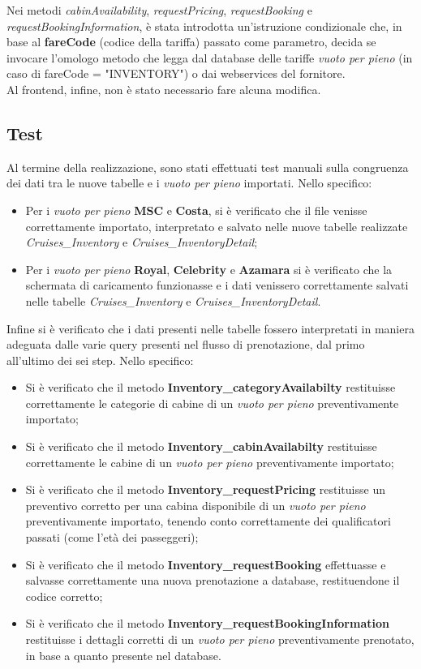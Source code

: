 Nei metodi \textit{cabinAvailability}, \textit{requestPricing}, \textit{requestBooking} e \textit{requestBookingInformation}, è stata introdotta un'istruzione condizionale che, in base al \textbf{fareCode} (codice della tariffa) passato come parametro, decida se invocare l'omologo metodo che legga dal database delle tariffe \textit{vuoto per pieno} (in caso di fareCode = "INVENTORY") o dai \glspl{webservice} del fornitore.\\
Al frontend, infine, non è stato necessario fare alcuna modifica.
\subsection{Test}
Al termine della realizzazione, sono stati effettuati test manuali sulla congruenza dei dati tra le nuove tabelle e i \textit{vuoto per pieno} importati. Nello specifico:
\begin{itemize}
	\item Per i \textit{vuoto per pieno} \textbf{MSC} e \textbf{Costa}, si è verificato che il file venisse correttamente importato, interpretato e salvato nelle nuove tabelle realizzate \textit{Cruises\_Inventory} e \textit{Cruises\_InventoryDetail};
	\item Per i \textit{vuoto per pieno} \textbf{Royal}, \textbf{Celebrity} e \textbf{Azamara} si è verificato che la schermata di caricamento funzionasse e i dati venissero correttamente salvati nelle tabelle \textit{Cruises\_Inventory} e \textit{Cruises\_InventoryDetail}.
\end{itemize} 
Infine si è verificato che i dati presenti nelle tabelle fossero interpretati in maniera adeguata dalle varie query presenti nel flusso di prenotazione, dal primo all'ultimo dei sei step. Nello specifico: 
\begin{itemize}
	\item Si è verificato che il metodo \textbf{Inventory\_categoryAvailabilty} restituisse correttamente le categorie di cabine di un \textit{vuoto per pieno} preventivamente importato;
	\item Si è verificato che il metodo \textbf{Inventory\_cabinAvailabilty} restituisse correttamente le cabine di un \textit{vuoto per pieno} preventivamente importato;
	\item Si è verificato che il metodo \textbf{Inventory\_requestPricing} restituisse un preventivo corretto per una cabina disponibile di un \textit{vuoto per pieno} preventivamente importato, tenendo conto correttamente dei qualificatori passati (come l'età dei passeggeri);
	\item Si è verificato che il metodo \textbf{Inventory\_requestBooking} effettuasse e salvasse correttamente una nuova prenotazione a database, restituendone il codice corretto;
	\item Si è verificato che il metodo \textbf{Inventory\_requestBookingInformation} restituisse i dettagli corretti di un \textit{vuoto per pieno} preventivamente prenotato, in base a quanto presente nel database.
\end{itemize}


